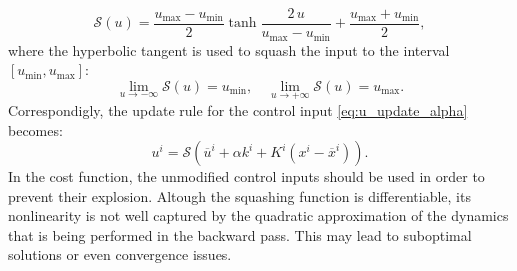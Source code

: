 \begin{equation*}
    \mathcal{S}(u) = \frac{u_{\text{max}} - u_{\text{min}}}{2} \tanh\frac{2\,u}{u_{\text{max}} - u_{\text{min}}} + \frac{u_{\text{max}} + u_{\text{min}}}{2},
\end{equation*}
where the hyperbolic tangent is used to squash the input to the interval $[u_{\text{min}}, u_{\text{max}}]$:
\begin{equation*}
    \lim_{u \to -\infty} \mathcal{S}(u) = u_{\text{min}}, \quad \lim_{u \to +\infty} \mathcal{S}(u) = u_{\text{max}}.
\end{equation*}
Correspondigly, the update rule for the control input \ref{eq:u_update_alpha} becomes:
\begin{equation}
    u^i = \mathcal{S}(\overline{u}^i + \alpha k^i + K^i (x^i - \overline{x}^i)). \label{eq:u_update_alpha_squash}
\end{equation}
In the cost function, the unmodified control inputs should be used in order to prevent their explosion. 
Altough the squashing function is differentiable, its nonlinearity is not well captured by the quadratic approximation of the dynamics that is being performed in the backward pass. This may lead to suboptimal solutions or even convergence issues.

